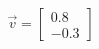 \documentclass[preview]{standalone}
\begin{document}
\begin{align*}
\vec{v}=\begin{bmatrix}0.8\\-0.3\end{bmatrix}
\end{align*}
\end{document}
